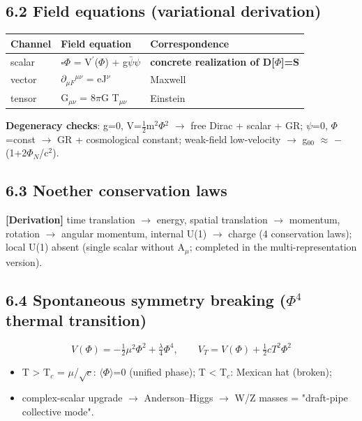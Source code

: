 \documentclass[12pt]{article}
\newcommand{\mtag}[1]{\textbf{[#1]}}
\newcommand{\up}[1]{\ensuremath{^{#1}}}
\newcommand{\down}[1]{\ensuremath{_{#1}}}
\begin{document}
\subsection{6.2 Field equations (variational derivation)}

\begin{table}[htbp]
\centering
\small
\begin{tabularx}{\textwidth}{@{}lXX@{}}
\toprule
Channel & Field equation & Correspondence \\
\midrule
scalar & \ensuremath{\square}\ensuremath{\Phi} = V\ensuremath{^\prime}(\ensuremath{\Phi}) + g\ensuremath{\bar{\psi}}\ensuremath{\psi} & \textbf{concrete realization of D[\ensuremath{\Phi}]=S} \\
vector & \ensuremath{\partial}\down{\mu{}F}\up{\mu{}\nu{}} = eJ\up{\nu{}} & Maxwell \\
tensor & G\down{\mu{}\nu{}} = 8\ensuremath{\pi}G T\down{\mu{}\nu{}} & Einstein \\
\bottomrule
\end{tabularx}
\end{table}

\textbf{Degeneracy checks}: g=0, V=\ensuremath{\tfrac12}m\up{2}\ensuremath{\Phi}\up{2} \ensuremath{\to} free Dirac + scalar + GR; \ensuremath{\psi}=0, \ensuremath{\Phi}=const \ensuremath{\to} GR + cosmological constant; weak-field low-velocity \ensuremath{\to} g\down{00} \ensuremath{\approx} \ensuremath{-}(1+2\ensuremath{\Phi}\down{N}/c\up{2}).

\subsection{6.3 Noether conservation laws}

\mtag{Derivation} time translation \ensuremath{\to} energy, spatial translation \ensuremath{\to} momentum, rotation \ensuremath{\to} angular momentum, internal U(1) \ensuremath{\to} charge (4 conservation laws); local U(1) absent (single scalar without A\down{\mu{}}; completed in the multi-representation version).

\subsection{6.4 Spontaneous symmetry breaking (\ensuremath{\Phi}\up{4} thermal transition)}

\[V(\Phi) = -\tfrac12\mu^2\Phi^2 + \tfrac{\lambda}{4}\Phi^4,\qquad V_T = V(\Phi) + \tfrac12 cT^2\Phi^2\]

\begin{itemize}
\item T > T\down{c} = \ensuremath{\mu}/\ensuremath{\sqrt{c}}: \ensuremath{\langle}\ensuremath{\Phi}\ensuremath{\rangle}=0 (unified phase); T < T\down{c}: Mexican hat (broken);
\item complex-scalar upgrade \ensuremath{\to} Anderson--Higgs \ensuremath{\to} W/Z masses = "draft-pipe collective mode".
\end{itemize}
\end{document}
